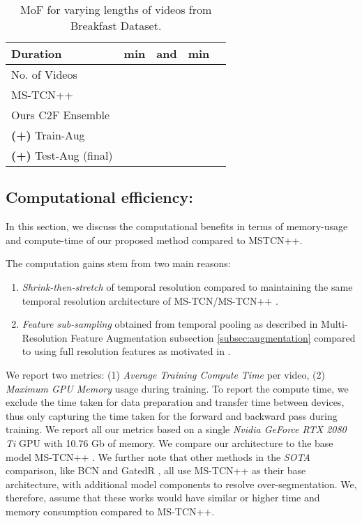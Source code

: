 \documentclass[10pt,twocolumn,letterpaper]{article}
\begin{document}
\begin{table}[]
\begin{center}
\small{
\begin{tabular}{|l|c|c|c|c|}
    \hline
    Duration &  min &  and  &  min \\
    \hline
    No. of Videos &  &  &  \\
    \hline
    MS-TCN++\cite{li2020ms} &  &  & \\
    Ours C2F Ensemble &  &  &  \\
    \textbf{(+)} Train-Aug &  &  &  \\
    \textbf{(+)} Test-Aug (final) &  &  &  \\
    \hline\hline
\end{tabular}
}
\end{center}
\caption{MoF for varying lengths of videos from Breakfast Dataset.}
\label{tab:length_exp}
\end{table}

\subsection{Computational efficiency:}

In this section, we discuss the computational benefits in terms of memory-usage and compute-time of our proposed method compared to MSTCN++\cite{li2020ms}. 

The computation gains stem from two main reasons:
\begin{enumerate}
    \item \textit{Shrink-then-stretch} of temporal resolution compared to maintaining the same temporal resolution architecture of  MS-TCN/MS-TCN++ \cite{farha2019ms,li2020ms}.
    \item \textit{Feature sub-sampling} obtained from temporal pooling as described in Multi-Resolution Feature Augmentation subsection \ref{subsec:augmentation} compared to using full resolution features as motivated in \cite{farha2019ms, li2020ms}.
\end{enumerate}

We report two metrics: (1) \textit{Average Training Compute Time} per video, (2) \textit{Maximum GPU Memory} usage during training. To report the compute time, we exclude the time taken for data preparation and transfer time between devices, thus only capturing the time taken for the forward and backward pass during training. 
We report all our metrics based on a single \textit{Nvidia GeForce RTX 2080 Ti} GPU with 10.76 Gb of memory. We compare our architecture to the base model MS-TCN++ \cite{li2020ms}.  We further note that other methods in the \textit{SOTA} comparison, like BCN \cite{wang2020boundary} and GatedR \cite{wang2020gated}, all use MS-TCN++ as their base architecture, with additional model components to resolve over-segmentation.  We, therefore, assume that these works would have similar or higher time and memory consumption compared to MS-TCN++. 
\end{document}
